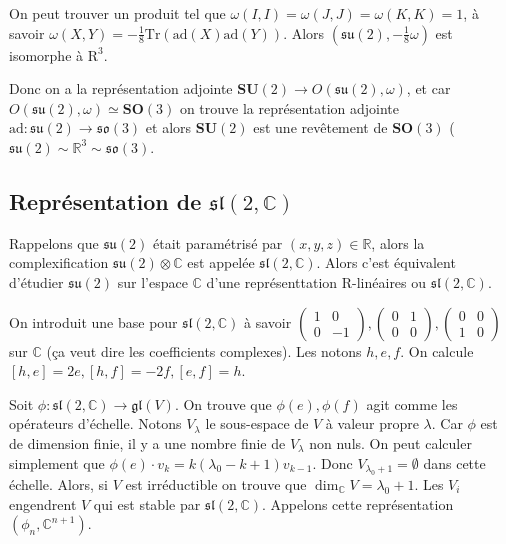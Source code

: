 \documentclass[10pt]{report}
\begin{document}
On peut trouver un produit tel que $\omega(I,I) = \omega(J,J)= \omega(K,K) = 1$, \`a savoir $\omega(X,Y) = -\frac{1}{8}\mathrm{Tr}\left( \mathrm{ad}(X)\mathrm{ad}(Y) \right)$. Alors $\left( \mathfrak{su}(2), -\frac{1}{8}\omega \right)$ est isomorphe \`a $\mathrm{R}^3$.

Donc on a la repr\'esentation adjointe $\mathbf{SU}(2) \to O(\mathfrak{su}(2), \omega)$, et car $O(\mathfrak{su}(2),\omega) \simeq \mathbf{SO}(3)$ on trouve la repr\'esentation adjointe $\mathrm{ad}: \mathfrak{su}(2) \to \mathfrak{so}(3)$ et alors $\mathbf{SU}(2)$ est une rev\^etement de $\mathbf{SO}(3)$ ($\mathfrak{su}(2) \sim \mathbb{R}^3 \sim \mathfrak{so}(3)$. 

\subsection{Repr\'esentation de $\mathfrak{sl}(2,\mathbb{C})$}

Rappelons que $\mathfrak{su}(2)$ \'etait param\'etris\'e par $(x,y,z) \in \mathbb{R}$, alors la complexification $\mathfrak{su}(2) \otimes \mathbb{C}$ est appel\'ee $\mathfrak{sl}(2,\mathbb{C})$. Alors c'est \'equivalent d'\'etudier $\mathfrak{su}(2)$ sur l'espace $\mathbb{C}$ d'une repr\'esenttation $\mathrm{R}$-lin\'eaires ou $\mathfrak{sl}(2,\mathbb{C})$. 

On introduit une base pour $\mathfrak{sl}(2,\mathbb{C})$ \`a savoir $\begin{pmatrix} 1 & 0\\0 & -1 \end{pmatrix} , \begin{pmatrix} 0 & 1\\0 & 0 \end{pmatrix} , \begin{pmatrix} 0 & 0\\1 & 0 \end{pmatrix} $ sur $\mathbb{C}$ (\c{c}a veut dire les coefficients complexes). Les notons $h,e,f$. On calcule $\left[ h,e \right] = 2e, \left[ h,f \right] = -2f, \left[ e,f \right] = h$.

Soit $\phi: \mathfrak{sl}(2,\mathbb{C}) \to \mathfrak{gl}(V)$. On trouve que $\phi(e), \phi(f)$ agit comme les op\'erateurs d'\'echelle. Notons $V_\lambda$ le sous-espace de $V$ \`a valeur propre $\lambda$. Car $\phi$ est de dimension finie, il y a une nombre finie de $V_\lambda$ non nuls. On peut calculer simplement que $\phi(e) \cdot v_k = k(\lambda_0 - k + 1)v_{k - 1}$. Donc $V_{\lambda_0 + 1} = \emptyset$ dans cette \'echelle. Alors, si $V$ est irr\'eductible on trouve que $\dim_{\mathbb{C}} V = \lambda_0 + 1$. Les $V_i$ engendrent $V$ qui est stable par $\mathfrak{sl}(2,\mathbb{C})$. Appelons cette repr\'esentation $(\phi_n, \mathbb{C}^{n+1})$.
\end{document}
